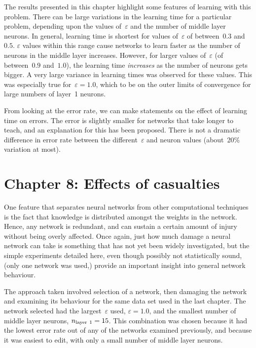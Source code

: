 \documentclass[12pt]{report}
\begin{document}
The results presented in this chapter highlight some features of
learning with this problem.
There can be large variations in the learning time for a particular
problem, depending upon the values of~$\varepsilon$ and the number
of middle layer neurons.
In general, learning time is shortest for values of~$\varepsilon$ of
between~$0.3$ and~$0.5$.
$\varepsilon$ values within this range cause networks to learn
faster as the number of neurons in the middle layer increases.
However, for larger values of~$\varepsilon$ (of between~$0.9$
and~$1.0$), the learning time {\sl increases\/} as the number of
neurons gets bigger.
A very large variance in learning times was observed for these
values.
This was especially true for~$\varepsilon = 1.0$, which to be on the
outer limits of convergence for large numbers of layer~1 neurons.

From looking at the error rate, we can make statements on the effect
of learning time on errors.
The error is slightly smaller for networks that take longer to
teach, and an explanation for this has been proposed.
There is not a dramatic difference in error rate between the
different~$\varepsilon$ and neuron values (about~20\% variation
at most).


\chapter{Chapter 8: Effects of casualties}

One feature that separates neural networks from other computational 
techniques is the fact that knowledge is distributed amongst the
weights in the network.
Hence, any network is redundant, and can sustain a certain amount of
injury without being overly affected.
Once again, just how much damage a neural network can take is something that
has not yet been widely investigated, but the simple experiments
detailed here, even though possibly not statistically sound, (only
one network was used,) provide an important insight into general
network behaviour.

The approach taken involved selection of a network, then damaging
the network and examining its behaviour for the same data set used
in the last chapter.
The network selected had the largest~$\varepsilon$ used,
$\varepsilon = 1.0$, and the smallest number of middle layer neurons,
$n_{\rm layer\ 1} = 15$.
This combination was chosen because it had the lowest error rate out
of any of the networks examined previously, and because it was
easiest to edit, with only a small number of middle layer neurons.
\end{document}
